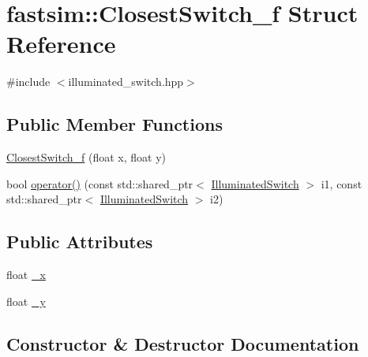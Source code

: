 \hypertarget{structfastsim_1_1_closest_switch__f}{}\section{fastsim\+:\+:Closest\+Switch\+\_\+f Struct Reference}
\label{structfastsim_1_1_closest_switch__f}


{\ttfamily \#include $<$illuminated\+\_\+switch.\+hpp$>$}

\subsection*{Public Member Functions}
\begin{DoxyCompactItemize}
\item 
\hyperlink{structfastsim_1_1_closest_switch__f_a8e0e0e0798444010ff84e08d52c430c1}{Closest\+Switch\+\_\+f} (float x, float y)
\item 
bool \hyperlink{structfastsim_1_1_closest_switch__f_a37836ac2edc70c20c8b093031c843845}{operator()} (const std\+::shared\+\_\+ptr$<$ \hyperlink{classfastsim_1_1_illuminated_switch}{Illuminated\+Switch} $>$ i1, const std\+::shared\+\_\+ptr$<$ \hyperlink{classfastsim_1_1_illuminated_switch}{Illuminated\+Switch} $>$ i2)
\end{DoxyCompactItemize}
\subsection*{Public Attributes}
\begin{DoxyCompactItemize}
\item 
float \hyperlink{structfastsim_1_1_closest_switch__f_ad5bd2786669e4668df4382d5b55683c9}{\+\_\+x}
\item 
float \hyperlink{structfastsim_1_1_closest_switch__f_a917691e2d4e0dba8405e73242b0edcfe}{\+\_\+y}
\end{DoxyCompactItemize}


\subsection{Constructor \& Destructor Documentation}
